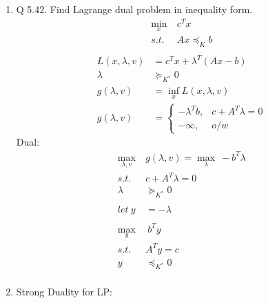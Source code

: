 \documentclass[12pt,letter]{article}
\begin{document}
\begin{enumerate}
  Relaxation of ith constraint by $\alpha$ percent:\\
  $\partial p^*(u_i,0) &= -\lambda_i^*\partial u_i$\\
  $\partial u_i = \alpha \implies$ objective function of log transformed problem experiences a decrease in value by $\lambda_i \alpha$\\
  Converting objective back via inverse of log: $x \to e^{y}$\\
  $z$ small $\implies e^{z} \approx 1+ z$ via Taylor expansion\\
  $e^{-\lambda_i^* \alpha} \approx 1 - \lambda_i^* \alpha, \lambda_i^* \geq 0 \implies$ objective function experiences an improvement of $\lambda_i^* \alpha$ percent since it is a minimization problem.\\
  \pagebreak
\item Q 5.42. Find Lagrange dual problem in inequality form.
  \begin{align*}
    \min_x\ & c^Tx\\
    s.t.\ & Ax \preceq_K b\\
  \end{align*}
  \begin{align*}
    L(x,\lambda,v) & = c^Tx + \lambda^T(Ax-b)\\
    \lambda & \succeq_{K^*} 0\\
    g (\lambda,v) &= \inf_x L(x,\lambda,v)\\
    g (\lambda,v) &=
                    \begin{cases}
                      -\lambda^Tb, & c + A^T\lambda = 0\\
                      -\infty, & o/w
                    \end{cases}
  \end{align*}
  Dual:
  \begin{align*}
    \max_{\lambda,v}\ & g(\lambda,v) = \max_{\lambda}\ -b^T\lambda\\
    s.t.\ & c+A^T\lambda = 0\\
    \lambda & \succeq_{K^*} 0\\
    \\
    let\ y & = -\lambda\\
    \\
    \max_{y}&\ b^Ty\\
    s.t.\ & A^Ty = c\\
    y & \preceq_{K^*} 0\\
  \end{align*}
  \pagebreak
\item Strong Duality for LP:\\

\end{enumerate}
\end{document}
